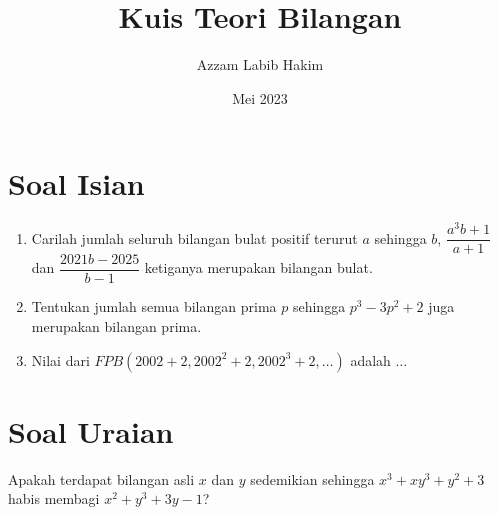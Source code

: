 \documentclass[12pt]{scrartcl}
\title{\textbf{Kuis Teori Bilangan}}
\author{Azzam Labib Hakim}
\date{Mei 2023}
\begin{document}
\maketitle

\renewcommand*\contentsname{Daftar Isi}
\tableofcontents

\newpage

\section{Soal Isian}
\begin{enumerate}
    \item Carilah jumlah seluruh bilangan bulat positif terurut $a$ sehingga $b$, $\dfrac{a^3b+1}{a+1}$ dan $\dfrac{2021b-2025}{b-1}$ ketiganya merupakan bilangan bulat.


\item  Tentukan jumlah semua bilangan prima $p$ sehingga $p^3-3p^2+2$ juga merupakan bilangan prima.

\item Nilai dari $FPB(2002+2,2002^2+2,2002^3+2,\dots)$ adalah $\dots$
\end{enumerate}

\section{Soal Uraian}
Apakah terdapat bilangan asli $x$ dan $y$ sedemikian sehingga $x^3+xy^3+y^2+3$ habis membagi $x^2+y^3+3y-1$?
	
	
\end{document}
